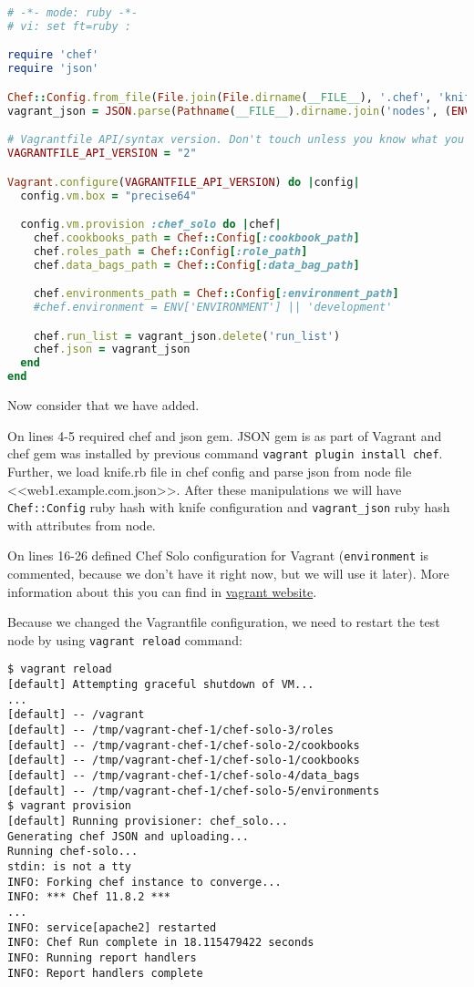 \begin{lstlisting}[language=Ruby,label=lst:my-cloud-vagrant7,title=my-cloud/nodes/Vagrantfile]
# -*- mode: ruby -*-
# vi: set ft=ruby :

require 'chef'
require 'json'

Chef::Config.from_file(File.join(File.dirname(__FILE__), '.chef', 'knife.rb'))
vagrant_json = JSON.parse(Pathname(__FILE__).dirname.join('nodes', (ENV['NODE'] || 'web1.example.com.json')).read)

# Vagrantfile API/syntax version. Don't touch unless you know what you're doing!
VAGRANTFILE_API_VERSION = "2"

Vagrant.configure(VAGRANTFILE_API_VERSION) do |config|
  config.vm.box = "precise64"

  config.vm.provision :chef_solo do |chef|
    chef.cookbooks_path = Chef::Config[:cookbook_path]
    chef.roles_path = Chef::Config[:role_path]
    chef.data_bags_path = Chef::Config[:data_bag_path]

    chef.environments_path = Chef::Config[:environment_path]
    #chef.environment = ENV['ENVIRONMENT'] || 'development'

    chef.run_list = vagrant_json.delete('run_list')
    chef.json = vagrant_json
  end
end
\end{lstlisting}

Now consider that we have added.

On lines 4-5 required chef and json gem. JSON gem is as part of Vagrant and chef gem was installed by previous command \lstinline!vagrant plugin install chef!. Further, we load knife.rb file in chef config and parse json from node file <<web1.example.com.json>>. After these manipulations we will have \lstinline!Chef::Config! ruby hash with knife configuration and \lstinline!vagrant_json! ruby hash with attributes from node.

On lines 16-26 defined Chef Solo configuration for Vagrant (\lstinline!environment! is commented, because we don't have it right now, but we will use it later). More information about this you can find in \href{http://docs.vagrantup.com/v2/provisioning/chef\_solo.html}{vagrant website}.

Because we changed the Vagrantfile configuration, we need to restart the test node by using \lstinline!vagrant reload! command:

\begin{lstlisting}[label=lst:my-cloud-vagrant8]
$ vagrant reload
[default] Attempting graceful shutdown of VM...
...
[default] -- /vagrant
[default] -- /tmp/vagrant-chef-1/chef-solo-3/roles
[default] -- /tmp/vagrant-chef-1/chef-solo-2/cookbooks
[default] -- /tmp/vagrant-chef-1/chef-solo-1/cookbooks
[default] -- /tmp/vagrant-chef-1/chef-solo-4/data_bags
[default] -- /tmp/vagrant-chef-1/chef-solo-5/environments
$ vagrant provision
[default] Running provisioner: chef_solo...
Generating chef JSON and uploading...
Running chef-solo...
stdin: is not a tty
INFO: Forking chef instance to converge...
INFO: *** Chef 11.8.2 ***
...
INFO: service[apache2] restarted
INFO: Chef Run complete in 18.115479422 seconds
INFO: Running report handlers
INFO: Report handlers complete
\end{lstlisting}

